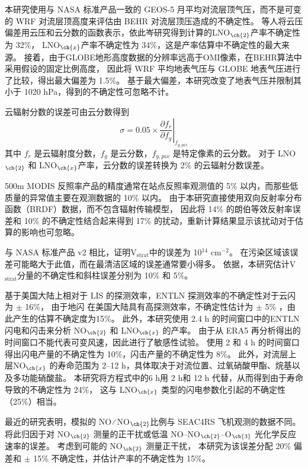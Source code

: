 本研究使用与 NASA 标准产品一致的 GEOS-5 月平均对流层顶气压，而不是可变的 WRF 对流层顶高度来评估由 BEHR 对流层顶压造成的不确定性。
\citet{Acarreta.2004}等人将云压偏差用云压和云分数的函数表示，依此岑研究得到计算的LNO$_{\ch{2}}$产率不确定性为 32\%，
LNO$_{\ch{x}}$产率不确定性为 34\%，这是产率估算中不确定性的最大来源。
接着，由于GLOBE地形高度数据的分辨率远高于OMI像素，在BEHR算法中采用假设的固定比例高度，
因此\citet{Laughner.2019a}将 WRF 平均地表气压与 GLOBE 地表气压进行了比较，得出最大偏差为 1.5\%。
基于最大偏差，本研究改变了地表气压并限制其小于 1020 hPa，得到的不确定性可忽略不计。

云辐射分数的误差可由云分数得到
\begin{equation}
\sigma = 0.05 \times \left.\frac{\partial{f_r}}{\partial{f_g}}\right|_{f_{g,pix}}
\end{equation}
其中 $f_r$ 是云辐射度分数，$f_g$ 是云分数，$f_{g,pix}$ 是特定像素的云分数。
对于 LNO$_{\ch{2}}$ 和 LNO$_{\ch{x}}$产率，云分数的误差转换为 2\% 的云辐射分数误差。

500m MODIS 反照率产品的精度通常在站点反照率观测值的 5\% 以内，而那些低质量的异常值主要在观测数据的 10\% 以内\citep{Schaaf.2011}。
由于本研究直接使用双向反射率分布函数（BRDF）数据，而不包含辐射传输模型，
因此将 14\% 的朗伯等效反射率误差和 10\% 的不确定性结合起来得到 17\% 的扰动\citep{Laughner.2019a}，重新计算结果显示该扰动对于估算的影响也可忽略。

与 NASA 标准产品 v2 相比，\citet{Krotkov.2017}证明V$_\textrm{strat}$中的误差为 10$^{14}$ cm$^{-2}$。
在污染区域该误差可能略大于此值，而在最清洁区域的误差通常要小得多\citep{Bucsela.2013}。
依据\citet{Allen.2019}，本研究估计V$_\textrm{strat}$分量的不确定性和斜柱误差分别为 10\% 和 5\%。

基于美国大陆上相对于 LIS 的探测效率，ENTLN 探测效率的不确定性对于云闪为 $\pm$ 16\%，
由于地闪 在美国大陆具有高探测效率，不确定性估计为 $\pm$ 5\% \citep{Lapierre.2020}，由此产生的估算不确定度为15\%。
此外，本研究使用 2.4 h 的时间窗口中的ENTLN闪电和闪击来分析 NO$_{\ch{2}}$ 和 LNO$_{\ch{x}}$ 的产率。
由于从 ERA5 再分析得出的时间窗口不能代表可变风速，因此进行了敏感性试验。
使用 2 和 4 h 的时间窗口得出闪电产量的不确定性为 10\%，闪击产量的不确定性为 8\%。
此外，对流层上层NO$_{\ch{x}}$ 的寿命范围为 2--12 h，具体取决于对流位置、过氧硝酸甲酯、烷基以及多功能硝酸盐\citep{Nault.2017}。
本研究将方程式中的6 h用 2 h和 12 h 代替，从而得到由于寿命导致的不确定性为 24\%，
这与 LNO$_{\ch{x}}$ 类型的闪电参数化引起的不确定性（25\%）相当。

最近的研究表明，模拟的 NO ∕ NO$_{\ch{2}}$比例与 SEAC4RS 飞机观测的数据不同\citep{Travis.2016,Silvern.2018}。
\citet{Silvern.2018}将此归因于对 NO$_{\ch{2}}$ 测量的正干扰或低温 NO--NO$_{\ch{2}}$--O$_{\ch{3}}$ 光化学反应速率的误差。
考虑到可能的 NO$_{\ch{2}}$ 测量正干扰\citep{Allen.2019,Bucsela.2019}，
本研究为该误差分配 20\% 偏差和 $\pm$ 15\% 不确定性，并估计产率的不确定性为 15\%。

